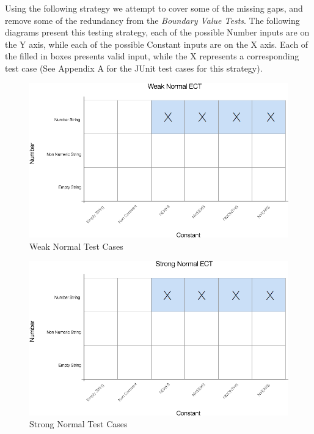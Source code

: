 Using the following strategy we attempt to cover some of the missing
gaps, and remove some of the redundancy from the \emph{Boundary Value
Tests}. The following diagrams present this testing strategy, each of
the possible Number inputs are on the Y axis, while each of the possible
Constant inputs are on the X axis. Each of the filled in boxes presents
valid input, while the X represents a corresponding test case (See
Appendix A for the JUnit test cases for this strategy).

\begin{figure}[htbp]
\centering
\includegraphics{../assets/weak-normal.png}
\caption{Weak Normal Test Cases}
\end{figure}

\begin{figure}[htbp]
\centering
\includegraphics{../assets/strong-normal.png}
\caption{Strong Normal Test Cases}
\end{figure}

